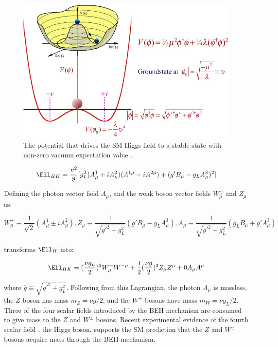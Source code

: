 \begin{figure}[h]
	\centering
	\includegraphics[width=1.0\textwidth]{figures/mexicanHatPotential.jpg}
	\caption{The potential that drives the SM Higgs field to a stable state with non-zero vacuum expectation value \cite{higgsPotential}.}
	\label{fig:smHiggsPotential}
\end{figure}

\begin{equation}
	\Ell_{HK} = \frac{\nu^{2}}{8}[g^{2}_{L}(A^{1}_{\mu} + iA^{2}_{\mu})(A^{1\mu} - iA^{2\mu}) + (g'B_{\mu} - g_{L}A^{3}_{\mu})^{2}]
\end{equation}

Defining the photon vector field $A_{\mu}$, and the weak boson vector fields $W^{\pm}_{\mu}$ and $Z_{\mu}$ as:

\begin{equation}
	W^{\pm}_{\mu} \equiv \frac{1}{\sqrt{2}}(A^{1}_{\mu} \pm iA^{2}_{\mu}), 
	Z_{\mu} \equiv \frac{1}{\sqrt{g'^{2} + g^{2}_{L}}}(g'B_{\mu} - g_{L}A^{3}_{\mu}), 
	A_{\mu} \equiv \frac{1}{\sqrt{g'^{2} + g^{2}_{L}}}(g_{L}B_{\mu} + g'A^{3}_{\mu})
\end{equation}

transforms $\Ell_{H}$ into:

\begin{equation}
	\Ell_{HK} = (\frac{\nu g_{L}}{2})^{2}W^{+}_{\mu}W^{-\mu} + \frac{1}{2}(\frac{\nu \bar{g}}{2})^{2}Z_{\mu}Z^{\mu} + 0A_{\mu}A^{\mu}
\end{equation}

where $\bar{g} \equiv \sqrt{g'^{2} + g^{2}_{L}}$.  Following from this Lagrangian, the photon $A_{\mu}$ is massless, 
the $Z$ boson has mass $m_{Z} = \nu\bar{g}/2$, and the $W^{\pm}$ bosons have mass $m_{W} = \nu g_{L}/2$.  
Three of the four scalar fields introduced by the BEH mechanism are consumed to give mass to the $Z$ 
and $W^{\pm}$ bosons.  Recent experimental evidence of the fourth scalar field \cite{combinedHiggsResult}, the Higgs boson, 
supports the SM prediction that the $Z$ and $W^{\pm}$ bosons acquire mass through the BEH mechanism.

